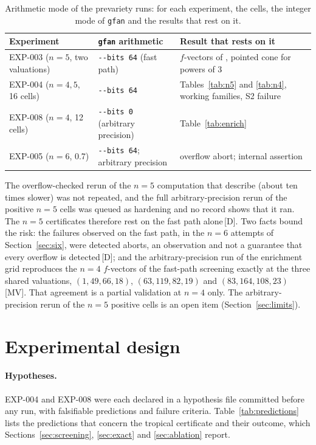 \documentclass[11pt]{article}
\theoremstyle{definition}
\theoremstyle{remark}
\newcommand{\mk}[1]{\,{\scriptsize[#1]}}
\newcommand{\MV}{\mk{MV}}
\newcommand{\Dm}{\mk{D}}
\begin{document}
\begin{table}[t]\centering\footnotesize
\begin{tabular}{@{}L{3.6cm}L{3.4cm}L{5.4cm}@{}}
\toprule
Experiment & \texttt{gfan} arithmetic & Result that rests on it \\
\midrule
EXP-003 ($n=5$, two valuations) & \texttt{-{}-bits 64} (fast path) & $f$-vectors of \cite{JL25}, pointed cone for powers of 3 \\
EXP-004 ($n=4,5$, 16 cells) & \texttt{-{}-bits 64} & Tables~\ref{tab:n5} and \ref{tab:n4}, working families, S2 failure \\
EXP-008 ($n=4$, 12 cells) & \texttt{-{}-bits 0} (arbitrary precision) & Table~\ref{tab:enrich} \\
EXP-005 ($n=6$, 0.7) & \texttt{-{}-bits 64}; arbitrary precision & overflow abort; internal assertion \\
\bottomrule
\end{tabular}
\caption{Arithmetic mode of the prevariety runs: for each experiment, the cells, the integer mode of \texttt{gfan} and the results that rest on it.}\label{tab:bits}
\end{table}

The overflow-checked rerun of the $n=5$ computation that \cite{JL25} describe (about ten times slower) was
not repeated, and the full arbitrary-precision rerun of the positive $n=5$ cells was queued as hardening
and no record shows that it ran. The $n=5$ certificates therefore rest on the fast path alone\Dm. Two facts
bound the risk: the failures observed on the fast path, in the $n=6$ attempts of Section~\ref{sec:six}, were detected aborts, an observation and not a guarantee that every overflow is detected\Dm;
and the arbitrary-precision run of the enrichment grid reproduces the $n=4$ $f$-vectors of the fast-path
screening exactly at the three shared valuations, $(1,49,66,18)$, $(63,119,82,19)$ and $(83,164,108,23)$\MV.
That agreement is a partial validation at $n=4$ only. The arbitrary-precision rerun of the $n=5$
positive cells is an open item (Section~\ref{sec:limits}).

\section{Experimental design}\label{sec:design}

\paragraph{Hypotheses.}
EXP-004 and EXP-008 were each declared in a hypothesis file committed before any run, with falsifiable predictions and failure criteria.
Table~\ref{tab:predictions} lists the predictions that concern the tropical certificate and their outcome, which Sections~\ref{sec:screening},
\ref{sec:exact} and \ref{sec:ablation} report.
\end{document}
